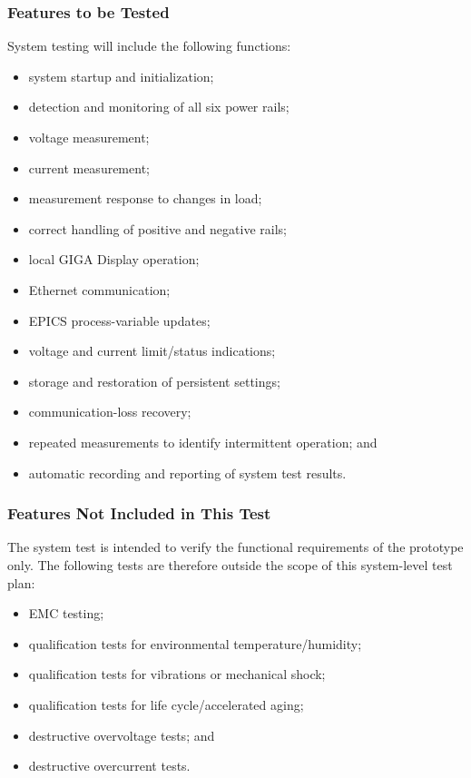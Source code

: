 \subsubsection{Features to be Tested}

System testing will include the following functions:

\begin{itemize}
    \item system startup and initialization;
    \item detection and monitoring of all six power rails;
    \item voltage measurement;
    \item current measurement;
    \item measurement response to changes in load;
    \item correct handling of positive and negative rails;
    \item local GIGA Display operation;
    \item Ethernet communication;
    \item EPICS process-variable updates;
    \item voltage and current limit/status indications;
    \item storage and restoration of persistent settings;
    \item communication-loss recovery;
    \item repeated measurements to identify intermittent operation; and
    \item automatic recording and reporting of system test results.
\end{itemize}

\subsubsection{Features Not Included in This Test}

The system test is intended to verify the functional requirements of the prototype only. The following
tests are therefore outside the scope of this system-level test plan:

\begin{itemize}
    \item EMC testing;
    \item qualification tests for environmental temperature/humidity;
    \item qualification tests for vibrations or mechanical shock;
    \item qualification tests for life cycle/accelerated aging;
    \item destructive overvoltage tests; and
    \item destructive overcurrent tests.
\end{itemize}


